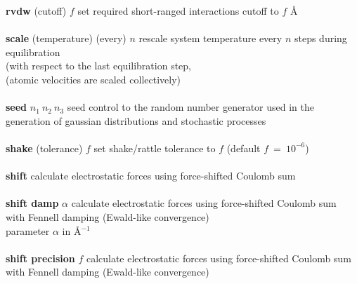 \begin{tabbing}
\> {\bf rvdw} (cutoff) $f$                      \> set required short-ranged interactions cutoff to $f$ \AA \\
\>                                              \> \\
\> {\bf scale} (temperature) (every) $n$        \> rescale system temperature every $n$ steps during equilibration \\
\>                                              \> (with respect to the last equilibration step, \\
\>                                              \> (atomic velocities are scaled collectively) \\
\>                                              \> \\
\> {\bf seed} $n_{1}~n_{2}~n_{3}$               \> seed control to the random number generator used in the \\
\>                                              \> generation of gaussian distributions and stochastic processes \\
\>                                              \> \\
\> {\bf shake} (tolerance) $f$                  \> set shake/rattle tolerance to $f$ (default $f~=~10^{-6}$) \\
\>                                              \> \\
\> {\bf shift}                                  \> calculate electrostatic forces using force-shifted Coulomb sum \\
\>                                              \> \\
\> {\bf shift damp} $\alpha$                    \> calculate electrostatic forces using force-shifted Coulomb sum \\
\>                                              \> with Fennell \cite{fennell-06a} damping (Ewald-like convergence) \\
\>                                              \> parameter $\alpha$ in \AA$^{-1}$ \\
\>                                              \> \\
\> {\bf shift precision} $f$                    \> calculate electrostatic forces using force-shifted Coulomb sum \\
\>                                              \> with Fennell \cite{fennell-06a} damping (Ewald-like convergence) \\

\end{tabbing}
